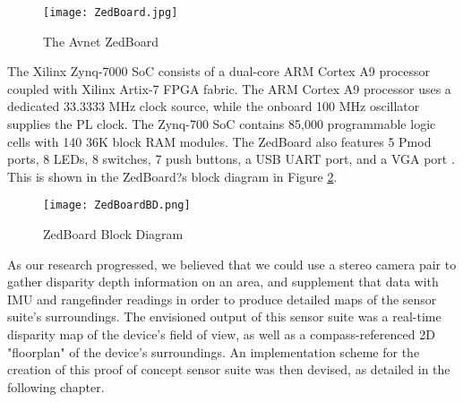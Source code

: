 \begin{figure}[H]
	\centerline{\texttt{[image: ZedBoard.jpg]}}
	\caption{The Avnet ZedBoard \cite{zedboard_photo}}
	\label{zedboard_pic}
\end{figure}

The Xilinx Zynq-7000 SoC consists of a dual-core ARM Cortex A9 processor coupled with Xilinx Artix-7 FPGA fabric. The ARM Cortex A9 processor uses a dedicated 33.3333 MHz clock source, while the onboard 100 MHz oscillator supplies the PL clock. The Zynq-700 SoC contains 85,000 programmable logic cells with 140 36K block RAM modules. The ZedBoard also features 5 Pmod ports, 8 LEDs, 8 switches, 7 push buttons, a USB UART port, and a VGA port \cite{zedboard_datasheet}. This is shown in the ZedBoard?s block diagram in Figure \ref{zedboardbd}.

\begin{figure}[H]
	\centerline{\texttt{[image: ZedBoardBD.png]}}
	\caption{ZedBoard Block Diagram \cite{zedboard_datasheet}}
	\label{zedboardbd}
\end{figure}
\par
As our research progressed, we believed that we could use a stereo camera pair to gather disparity depth information on an area, and supplement that data with IMU and rangefinder readings in order to produce detailed maps of the sensor suite's surroundings. The envisioned output of this sensor suite was a real-time disparity map of the device's field of view, as well as a compass-referenced 2D "floorplan" of the device's surroundings. An implementation scheme for the creation of this proof of concept sensor suite was then devised, as detailed in the following chapter.